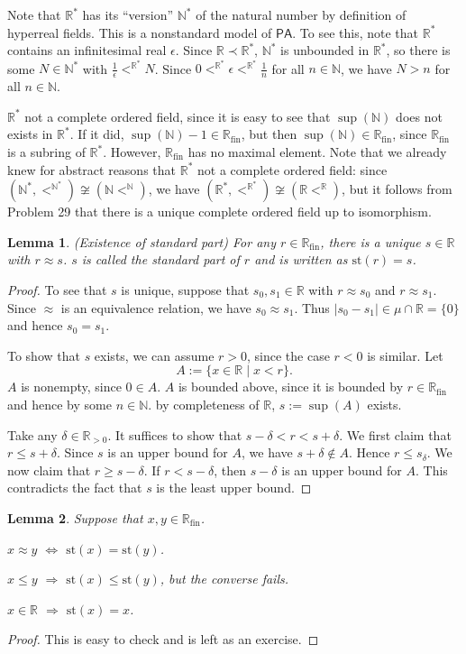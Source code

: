 \documentclass[a4paper, 11pt]{amsart}
\newtheorem{lemma}[lemma]{Lemma}
\theoremstyle{remark}
\newcommand{\axiomft}[1]{\mathsf{#1}}
\newcommand{\PA}{\axiomft{PA}}
\newcommand{\NN}{\mathbb{N}}
\newcommand{\st}{\mathrm{st}}
\DeclareMathOperator{\fin}{fin}
\newcommand{\RR}{\mathbb{R}}
\newenvironment{enumerate-(1)}{\begin{enumerate}[label={\upshape (\arabic*)}, leftmargin=2pc]}{\end{enumerate}}
\begin{document}
Note that $\RR^*$ has its ``version'' $\NN^*$ of the natural number by definition of hyperreal fields.   
This is a nonstandard model of $\PA$. 
To see this, note that $\RR^*$ contains an infinitesimal real $\epsilon$. 
Since $\RR\prec \RR^*$, $\NN^*$ is unbounded in $\RR^*$, so  there is some $N\in \NN^*$ with $\frac{1}{\epsilon} <^{\RR^*} N$. 
Since $0<^{\RR^*}\epsilon <^{\RR^*} \frac{1}{n}$ for all $n\in\NN$, we have $N>n$ for all $n\in\NN$. 

$\RR^*$ not a complete ordered field, since it is easy to see that $\sup(\NN)$ does not exists in $\RR^*$. 
If it did, $\sup(\NN)-1 \in \RR_{\fin}$, but then $\sup(\NN)\in \RR_{\fin}$, since $\RR_{\fin}$ is a subring of $\RR^*$. 
However, $\RR_{\fin}$ has no maximal element. 
Note that we already knew for abstract reasons that $\RR^*$ not a complete ordered field: 
since $(\NN^*,<^{\NN^*}) \not \cong (\NN<^\NN)$, we have $(\RR^*,<^{\RR^*}) \not \cong (\RR<^\RR)$, but it follows from Problem 29 that there is a unique complete ordered field up to isomorphism. 


\begin{lemma}  (Existence of standard part)
For any $r\in \RR_{\fin}$, there is a unique $s\in \RR$ with $r \approx s$. 
$s$ is called the \emph{standard part} of $r$ and is written as $\st(r)=s$. 
\end{lemma} 
\begin{proof} 
To see that $s$ is unique, suppose that $s_0,s_1\in \RR$ with $r\approx s_0$ and $r\approx s_1$. 
Since $\approx$ is an equivalence relation, we have $s_0\approx s_1$. 
Thus $|s_0-s_1| \in \mu \cap \RR =\{0\}$ and hence $s_0=s_1$. 

To show that $s$ exists, we can assume $r>0$, since the case $r<0$ is similar. 
Let 
$$ A := \{x\in \RR \mid x<r\}.$$ 
$A$ is nonempty, since $0 \in A$. 
$A$ is bounded above, since it is bounded by $r\in \RR_{\fin}$ and hence by some $n\in \NN$. 
by completeness of $\RR$, $s:=\sup(A)$ exists. 

Take any $\delta \in \RR_{>0}$. 
It suffices to show that $s-\delta < r < s+\delta$. 
We first claim that $r\leq s+\delta$. 
Since $s$ is an upper bound for $A$, we have $s+\delta \notin A$. Hence $r\leq s_\delta$. 
We now claim that $r\geq s-\delta$. 
If $r < s-\delta$, then $s-\delta$ is an upper bound for $A$. 
This contradicts the fact that $s$ is the least upper bound. 
\end{proof} 

\begin{lemma} 
Suppose that $x,y \in \RR_{\fin}$. 
\begin{enumerate-(1)} 
\item 
$x\approx y $ $\Longleftrightarrow $  $\st(x)=\st(y)$. 
\item 
$x\leq y $ $\Longrightarrow $  $\st(x)\leq\st(y)$, but the converse fails. 
\item 
$x\in \RR$ $\Longrightarrow $  $\st(x)=x$. 
\end{enumerate-(1)} 
\end{lemma} 
\begin{proof} 
This is easy to check and is left as an exercise. 
\end{proof} 
\end{document}
